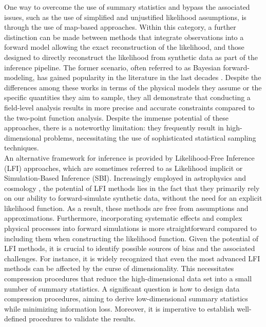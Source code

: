 \documentclass{aa}
\begin{document}
One way to overcome the use of summary statistics and bypass the associated issues, such as the use of simplified and unjustified likelihood assumptions, is through the use of map-based approaches.
Within this category, a further distinction can be made between methods that integrate observations into a forward model allowing the exact reconstruction of the likelihood, and those designed to directly reconstruct the likelihood from synthetic data as part of the inference pipeline.
The former scenario, often referred to as Bayesian forward-modeling,  has gained popularity in the literature in the last decades \citep{schneider2015hierarchical, alsing2016hierarchical, alsing2017cosmological, bohm2017bayesian, porqueres2021bayesian, porqueres2022lifting, porqueres2023field}. Despite the differences among these works in terms of the physical models they assume or the specific quantities they aim to sample, they all demonstrate that conducting a field-level analysis results in more precise and accurate constraints compared to the two-point function analysis.
Despite the immense potential of these approaches, there is a noteworthy limitation: they frequently result in high-dimensional problems, necessitating the use of sophisticated statistical sampling techniques. \\
An alternative framework for inference is provided by Likelihood-Free Inference (LFI) approaches, which are sometimes referred to as Likelihood implicit or Simulation-Based Inference (SBI). Increasingly employed in astrophysics and cosmology \citep{lin2015new, alsing2018generalized, jeffrey2021likelihood, gerardi2021unbiased, tam2022likelihood}, the potential of LFI methods lies in the fact that they primarily rely on our ability to forward-simulate synthetic data, without the need for an explicit likelihood function. As a result, these methods are free from assumptions and approximations. Furthermore, incorporating systematic effects and complex physical processes into forward simulations is more straightforward compared to including them when constructing the likelihood function.
Given the potential of LFI methods, it is crucial to identify possible sources of bias and the associated challenges. For instance, it is widely recognized that even the most advanced LFI methods can be affected by the curse of dimensionality. This necessitates compression procedures that reduce the high-dimensional data set into a small number of summary statistics.
A significant question is how to design data compression procedures, aiming to derive low-dimensional summary statistics while minimizing information loss. Moreover, it is imperative to establish well-defined procedures to validate the results.
\end{document}
